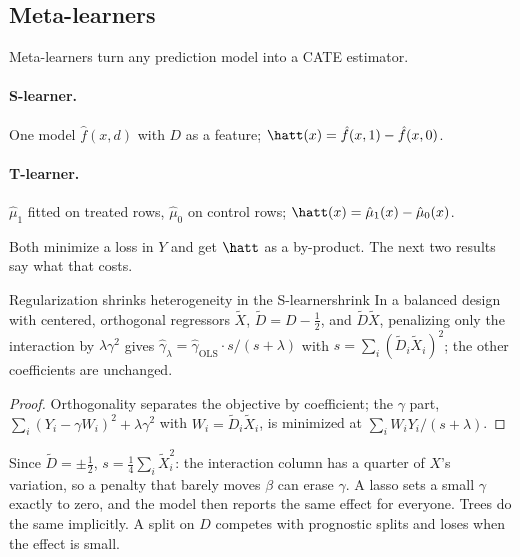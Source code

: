 \documentclass[11pt]{article}
\begin{document}
\subsection{Meta-learners}

Meta-learners turn any prediction model into a CATE estimator.

\paragraph{S-learner.} One model $\hat f(x, d)$ with $D$ as a feature; $\hatt(x) = \hat f(x,1) - \hat f(x,0)$.

\paragraph{T-learner.} $\hat\mu_1$ fitted on treated rows, $\hat\mu_0$ on control rows;
$\hatt(x) = \hat\mu_1(x) - \hat\mu_0(x)$.

Both minimize a loss in $Y$ and get $\hatt$ as a by-product. The next two results say what that costs.

\begin{prop}{Regularization shrinks heterogeneity in the S-learner}{shrink}
In a balanced design with centered, orthogonal regressors $\tilde X$, $\tilde D = D - \tfrac12$, and
$\tilde D\tilde X$, penalizing only the interaction by $\lambda\gamma^2$ gives
$\hat\gamma_\lambda = \hat\gamma_{\text{OLS}} \cdot s/(s + \lambda)$ with $s = \sum_i (\tilde D_i \tilde X_i)^2$; the other
coefficients are unchanged.
\end{prop}
\begin{proof}
Orthogonality separates the objective by coefficient; the $\gamma$ part, $\sum_i (Y_i - \gamma W_i)^2 + \lambda\gamma^2$
with $W_i = \tilde D_i\tilde X_i$, is minimized at $\sum_i W_iY_i/(s+\lambda)$.
\end{proof}
Since $\tilde D = \pm\tfrac12$, $s = \tfrac14\sum_i \tilde X_i^2$: the interaction column has a quarter of $X$'s
variation, so a penalty that barely moves $\beta$ can erase $\gamma$. A lasso sets a small $\gamma$ exactly to zero,
and the model then reports the same effect for everyone. Trees do the same implicitly. A split on $D$ competes
with prognostic splits and loses when the effect is small.
\end{document}
